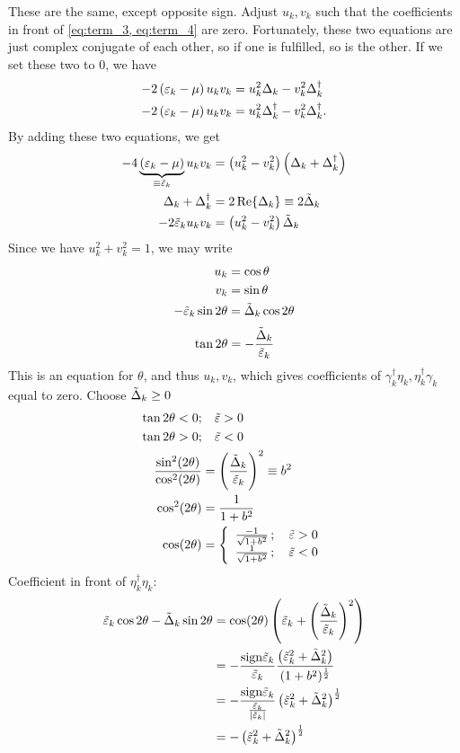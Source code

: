 These are the same, except opposite sign. Adjust $u_k, v_k$ such that the coefficients in front of \cref{eq:term_3, eq:term_4} are zero. Fortunately, these two equations are just complex conjugate of each other, so if one is fulfilled, so is the other.
If we set these two to $0$, we have
\begin{align}
		-2\left(\varepsilon_k - \mu\right)u_kv_k &= u_k^2\Delta_k - v_k^2\Delta_k^\dagger \\
		-2\left(\varepsilon_k - \mu\right)u_kv_k &= u_k^2\Delta_k^\dagger-v_k^2\Delta_k^\dagger.
\end{align}
By adding these two equations, we get
\begin{align*}
-4\underbrace{\left(\varepsilon_k-\mu\right)}_{\equiv\tilde{\varepsilon}_k}u_kv_k &= \left(u_k^2-v_k^2\right)\left(\Delta_k+\Delta_k^\dagger\right) \\
\Delta_k+\Delta_k^\dagger &=  2\Re{\Delta_k} \equiv 2\tilde{\Delta}_k \\
-2\tilde{\varepsilon}_ku_kv_k &= \left(u_k^2-v_k^2\right)\tilde{\Delta}_k
\end{align*}
Since we have $u_k^2+v_k^2 = 1$, we may write 
\begin{align*}
	u_k &= \cos\theta \\
	v_k &=\sin\theta \\
	-\tilde{\varepsilon}_k\sin2\theta &= \tilde{\Delta}_k\cos2\theta 
\end{align*}
\begin{equation}
\label{eq:BCS_theta}
	\tan 2\theta =-\frac{\tilde{\Delta}_k}{\tilde{\varepsilon}_k}
\end{equation}
This is an equation for $\theta$, and thus $u_k, v_k$, which gives coefficients of $\gamma_k^\dagger\eta_k, \eta_k^\dagger\gamma_k$ equal to zero. 
Choose $\tilde{\Delta}_k \ge0$
\begin{align*}
	\tan2\theta <0 ;&\quad \tilde{\varepsilon} >0 \\
	\tan2\theta >0 ;&\quad \tilde{\varepsilon} <0 \\
	\frac{\sin[2](2\theta)}{\cos[2](2\theta)} &= \left(\frac{\tilde{\Delta}_k}{\tilde{\varepsilon}_k}\right)^2 \equiv b^2 \\
	\cos[2](2\theta) &= \frac{1}{1+b^2} \\
	\cos(2\theta) &= \left\{\begin{array}{ll} \frac{-1}{\sqrt{1+b^2}}\, ; \quad \tilde{\varepsilon} >0 \\ \frac{1}{\sqrt{1+b^2}}\, ; \quad \tilde{\varepsilon} <0
	\end{array}\right.
\end{align*}
Coefficient in front of $\eta_k^\dagger\eta_k$:
\begin{align*}
\tilde{\varepsilon}_k\cos2\theta - \tilde{\Delta}_k\sin2\theta &= \cos(2\theta)\left(\tilde{\varepsilon}_k+\left(\frac{\tilde{\Delta}_k}{\tilde{\varepsilon}_k}\right)^2\right) \\
&= -\frac{\text{sign}\tilde{\varepsilon}_k}{\tilde{\varepsilon}_k}\frac{\left(\tilde{\varepsilon}_k^2 + \tilde{\Delta}_k^2\right)}{(1+b^2)^{\frac12}} \\
&= -\frac{\text{sign}\tilde{\varepsilon}_k}{\frac{\tilde{\varepsilon}_k}{|\tilde{\varepsilon}_k|}}\left(\tilde{\varepsilon}_k^2 + \tilde{\Delta}_k^2\right)^\frac12 \\
&= -\left(\tilde{\varepsilon}_k^2 + \tilde{\Delta}_k^2\right)^\frac12
\end{align*}
